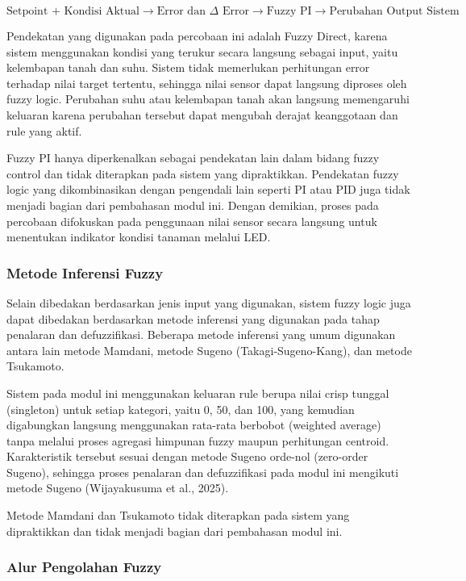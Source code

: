 \documentclass[12pt,a4paper]{article}
\begin{document}
\[
\text{Setpoint + Kondisi Aktual}
\rightarrow
\text{Error dan } \Delta\text{ Error}
\rightarrow
\text{Fuzzy PI}
\rightarrow
\text{Perubahan Output Sistem}
\]

Pendekatan yang digunakan pada percobaan ini adalah Fuzzy Direct, karena sistem menggunakan kondisi yang terukur secara langsung sebagai input, yaitu kelembapan tanah dan suhu. Sistem tidak memerlukan perhitungan error terhadap nilai target tertentu, sehingga nilai sensor dapat langsung diproses oleh fuzzy logic. Perubahan suhu atau kelembapan tanah akan langsung memengaruhi keluaran karena perubahan tersebut dapat mengubah derajat keanggotaan dan rule yang aktif.

Fuzzy PI hanya diperkenalkan sebagai pendekatan lain dalam bidang fuzzy control dan tidak diterapkan pada sistem yang dipraktikkan. Pendekatan fuzzy logic yang dikombinasikan dengan pengendali lain seperti PI atau PID juga tidak menjadi bagian dari pembahasan modul ini. Dengan demikian, proses pada percobaan difokuskan pada penggunaan nilai sensor secara langsung untuk menentukan indikator kondisi tanaman melalui LED.

\subsubsection{Metode Inferensi Fuzzy}

Selain dibedakan berdasarkan jenis input yang digunakan, sistem fuzzy logic juga dapat dibedakan berdasarkan metode inferensi yang digunakan pada tahap penalaran dan defuzzifikasi. Beberapa metode inferensi yang umum digunakan antara lain metode Mamdani, metode Sugeno (Takagi-Sugeno-Kang), dan metode Tsukamoto.

Sistem pada modul ini menggunakan keluaran rule berupa nilai crisp tunggal (singleton) untuk setiap kategori, yaitu 0, 50, dan 100, yang kemudian digabungkan langsung menggunakan rata-rata berbobot (weighted average) tanpa melalui proses agregasi himpunan fuzzy maupun perhitungan centroid. Karakteristik tersebut sesuai dengan metode Sugeno orde-nol (zero-order Sugeno), sehingga proses penalaran dan defuzzifikasi pada modul ini mengikuti metode Sugeno (Wijayakusuma et al., 2025).

Metode Mamdani dan Tsukamoto tidak diterapkan pada sistem yang dipraktikkan dan tidak menjadi bagian dari pembahasan modul ini.

\subsubsection{Alur Pengolahan Fuzzy}
\end{document}
